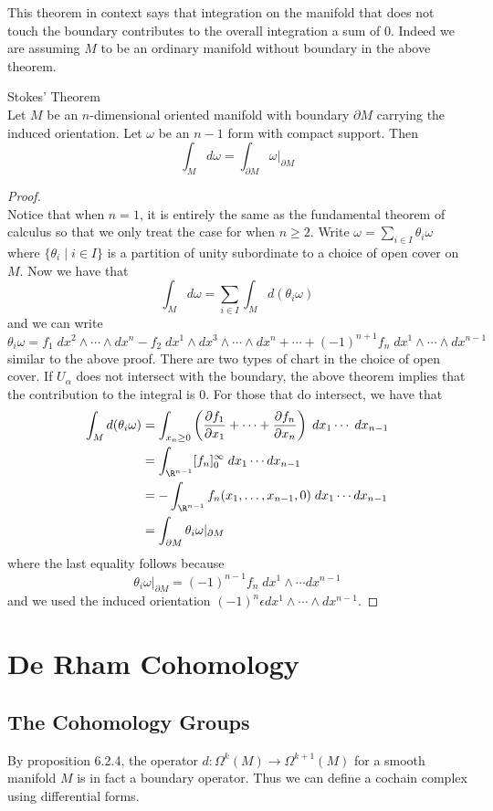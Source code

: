 \documentclass[a4paper]{article}
\begin{document}
This theorem in context says that integration on the manifold that does not touch the boundary contributes to the overall integration a sum of $0$. Indeed we are assuming $M$ to be an ordinary manifold without boundary in the above theorem. 

\begin{thm}{Stokes' Theorem}{}\\
Let $M$ be an $n$-dimensional oriented manifold with boundary $\partial M$ carrying the induced orientation. Let $\omega$ be an $n-1$ form with compact support. Then $$\int_Md\omega=\int_{\partial M}\omega|_{\partial M}$$ 
\begin{proof}\\
Notice that when $n=1$, it is entirely the same as the fundamental theorem of calculus so that we only treat the case for when $n\geq 2$. Write $\omega=\sum_{i\in I}\theta_i\omega$ where $\{\theta_i\;|\;i\in I\}$ is a partition of unity subordinate to a choice of open cover on $M$. Now we have that $$\int_Md\omega=\sum_{i\in I}\int_Md(\theta_i\omega)$$ and we can write $$\theta_i\omega=f_1\;dx^2\wedge\cdots\wedge dx^n-f_2\;dx^1\wedge dx^3\wedge\cdots\wedge dx^n+\cdots+(-1)^{n+1}f_n\;dx^1\wedge\cdots\wedge dx^{n-1}$$ similar to the above proof. There are two types of chart in the choice of open cover. If $U_\alpha$ does not intersect with the boundary, the above theorem implies that the contribution to the integral is $0$. For those that do intersect, we have that 
\begin{align*}
\int_Md(\theta_i\omega)&=\int_{x_n\geq 0}\left(\frac{\partial f_1}{\partial x_1}+\cdots+\frac{\partial f_n}{\partial x_n}\right)\;dx_1\cdots\;dx_{n-1}\\
&=\int_{\R^{n-1}}[f_n]_0^\infty\;dx_1\cdots dx_{n-1}\\
&=-\int_{\R^{n-1}}f_n(x_1,\dots,x_{n-1},0)\;dx_1\cdots dx_{n-1}\\
&=\int_{\partial M}\theta_i\omega|_{\partial M}
\end{align*}
where the last equality follows because $$\theta_i\omega|_{\partial M}=(-1)^{n-1}f_n\;dx^1\wedge\cdots dx^{n-1}$$ and we used the induced orientation $(-1)^n\epsilon dx^1\wedge\cdots\wedge dx^{n-1}$. 
\end{proof}
\end{thm}

\pagebreak
\section{De Rham Cohomology}
\subsection{The Cohomology Groups}
By proposition 6.2.4, the operator $d:\Omega^k(M)\to\Omega^{k+1}(M)$ for a smooth manifold $M$ is in fact a boundary operator. Thus we can define a cochain complex using differential forms. 
\end{document}
